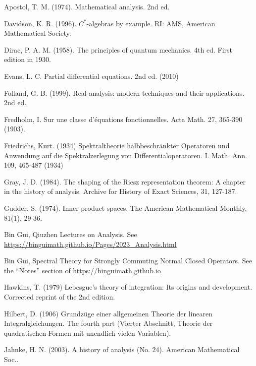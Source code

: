 \documentclass[12pt,b5paper,notitlepage]{article}
\theoremstyle{definition}
\theoremstyle{plain}
\numberwithin{equation}{section}
\begin{document}
	\begin{thebibliography}{999999}
		\footnotesize	

Apostol, T. M. (1974). Mathematical analysis. 2nd ed.

Davidson, K. R. (1996). $C^*$-algebras by example. RI: AMS, American Mathematical Society.


Dirac, P. A. M. (1958). The principles of quantum mechanics. 4th ed. First edition in 1930.

Evans, L. C. Partial differential equations. 2nd ed. (2010)


Folland, G. B. (1999). Real analysis: modern techniques and their applications. 2nd ed.

Fredholm, I. Sur une classe d'{\'e}quations fonctionnelles. Acta Math. 27, 365-390 (1903).

Friedrichs, Kurt. (1934) Spektraltheorie halbbeschr{\"a}nkter {Operatoren} und {Anwendung} auf die {Spektralzerlegung} von {Differentialoperatoren}. {I}. Math. Ann. 109, 465-487 (1934)


Gray, J. D. (1984). The shaping of the Riesz representation theorem: A chapter in the history of analysis. Archive for History of Exact Sciences, 31, 127-187.

Gudder, S. (1974). Inner product spaces. The American Mathematical Monthly, 81(1), 29-36.

Bin Gui, Qiuzhen Lectures on Analysis. See \url{https://binguimath.github.io/Pages/2023_Analysis.html}

Bin Gui, Spectral Theory for Strongly Commuting Normal Closed Operators. See the ``Notes'' section of \url{https://binguimath.github.io}
%

Hawkins, T. (1979) Lebesgue's theory of integration: Its origins and development. Corrected reprint of the 2nd edition. 

Hilbert, D. (1906) Grundz\"uge einer allgemeinen Theorie der linearen Integralgleichungen. The fourth part (Vierter Abschnitt, Theorie der quadratischen Formen mit unendlich vielen Variablen).

Jahnke, H. N. (2003). A history of analysis (No. 24). American Mathematical Soc..


\end{thebibliography}
\end{document}
